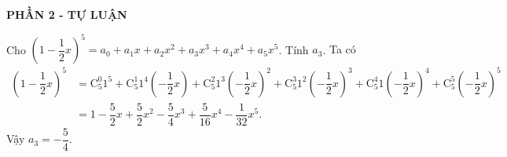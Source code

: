 \begin{center}
	\textbf{PHẦN 2 - TỰ LUẬN}
\end{center}

\begin{bt}%
Cho $\left(1-\dfrac{1}{2}x\right)^5 = a_0+a_1x+a_2x^2+a_3x^3+a_4x^4+a_5x^5$. Tính $a_3$.
\loigiai
{Ta có 
\begin{align*}
\left(1-\dfrac{1}{2}x\right)^5 &= \mathrm{C}_5^0 1^5 + \mathrm{C}_5^1 1^4 \left(-\dfrac{1}{2}x\right)+ \mathrm{C}_5^2 1^3 \left(-\dfrac{1}{2}x\right)^2+ \mathrm{C}_5^3 1^2 \left(-\dfrac{1}{2}x\right)^3+ \mathrm{C}_5^4 1 \left(-\dfrac{1}{2}x\right)^4+ \mathrm{C}_5^5 \left(-\dfrac{1}{2}x\right)^5\\&= 1-\dfrac{5}{2}x+\dfrac{5}{2}x^2-\dfrac{5}{4}x^3+\dfrac{5}{16}x^4-\dfrac{1}{32}x^5.
\end{align*}
Vậy $a_3=-\dfrac{5}{4}$.
}
\end{bt}

